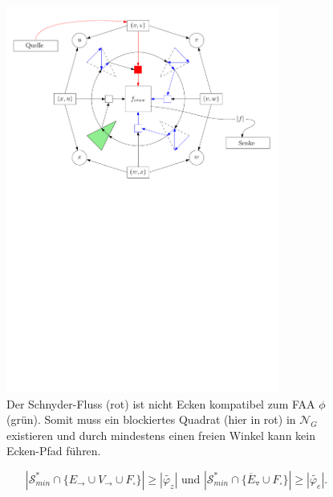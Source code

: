 \begin{figure}
	\centering
  	\includegraphics[width=0.8\textwidth]{combined_face_not_corner.pdf}
  	\caption{Der Schnyder-Fluss (rot) ist nicht Ecken kompatibel zum FAA $\phi$ (grün). Somit muss ein blockiertes Quadrat (hier in rot) in $\mathcal{N}_G$ existieren und durch mindestens einen freien Winkel kann kein Ecken-Pfad führen.}
	\label{combined_face_not_corner}
\end{figure}



$$|\mathcal{S}_{min}^*\cap\{E_\to \cup V_\to \cup F_\square \}| \geq |\tilde{\varphi_z}| \text{  und  } |\mathcal{S}_{min}^*\cap\{\overline{E}_\triangledown \cup F_\square \}| \geq |\tilde{\varphi_e}|.$$


